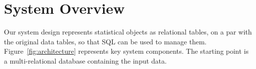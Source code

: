 \documentclass[letterpaper]{article}
\begin{document}
\section{System Overview} 

Our system design represents statistical objects as  relational tables, on a par with the original data tables, so that SQL can be used  to manage them. 
Figure~\ref{fig:architecture} represents key system components. The starting point is a multi-relational database containing the input data. 

%
%
%
%




\end{document}
